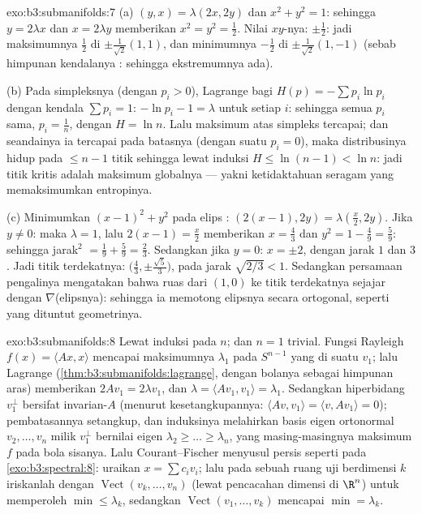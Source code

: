 \begin{solution}{exo:b3:submanifolds:7}
(a) $(y, x) = \lambda(2x, 2y)$ dan $x^2 + y^2 = 1$: sehingga $y =
2\lambda x$ dan $x = 2\lambda y$ memberikan $x^2 = y^2 = \frac12$.
Nilai $xy$-nya: $\pm\frac12$: jadi maksimumnya $\frac12$ di
$\pm\frac1{\sqrt2}(1,1)$, dan minimumnya $-\frac12$ di
$\pm\frac1{\sqrt2}(1,-1)$ (sebab himpunan kendalanya :
sehingga ekstremumnya ada).

(b) Pada  simpleksnya (dengan $p_i > 0$), Lagrange bagi
$H(p) = -\sum p_i\ln p_i$ dengan kendala $\sum p_i = 1$:
$-\ln p_i - 1 = \lambda$ untuk setiap $i$: sehingga semua $p_i$ sama, $p_i =
\frac1n$, dengan $H = \ln n$. Lalu maksimum atas simpleks 
tercapai; dan seandainya ia tercapai pada batasnya
(dengan suatu $p_i = 0$), maka distribusinya hidup pada $\leq n - 1$
titik sehingga lewat induksi $H \leq \ln(n-1) < \ln n$: jadi
titik kritis  adalah maksimum globalnya --- yakni
ketidaktahuan seragam yang memaksimumkan entropinya.

(c) Minimumkan $(x-1)^2 + y^2$ pada elips :
$(2(x{-}1), 2y) = \lambda(\frac x2, 2y)$. Jika $y \neq 0$: maka
$\lambda = 1$, lalu $2(x - 1) = \frac x2$ memberikan $x =
\frac43$ dan $y^2 = 1 - \frac49 = \frac59$: sehingga jarak$^2$ $=
\frac19 + \frac59 = \frac23$. Sedangkan jika $y = 0$: $x = \pm2$,
dengan jarak $1$ dan $3$. Jadi titik terdekatnya: $\bigl(\frac43,
\pm\frac{\sqrt5}3\bigr)$, pada jarak $\sqrt{2/3} < 1$. Sedangkan
persamaan pengalinya mengatakan bahwa ruas dari $(1,0)$ ke
titik terdekatnya sejajar dengan $\nabla$(elipsnya): sehingga ia memotong
elipsnya secara ortogonal, seperti yang dituntut geometrinya.
\end{solution}

\begin{solution}{exo:b3:submanifolds:8}
Lewat induksi pada $n$; dan $n = 1$ trivial. Fungsi Rayleigh
$f(x) = \langle Ax, x\rangle$ mencapai maksimumnya $\lambda_1$
pada $S^{n-1}$ yang  di suatu $v_1$; lalu Lagrange
(\cref{thm:b3:submanifolds:lagrange}, dengan bolanya sebagai himpunan aras)
memberikan $2Av_1 = 2\lambda v_1$, dan $\lambda = \langle Av_1,
v_1\rangle = \lambda_1$. Sedangkan hiperbidang $v_1^\perp$ bersifat
invarian-$A$ (menurut kesetangkupannya: $\langle Av, v_1\rangle = \langle
v, Av_1\rangle = 0$); pembatasannya setangkup, dan
induksinya melahirkan basis eigen ortonormal $v_2, \dots, v_n$
milik $v_1^\perp$ bernilai eigen $\lambda_2 \geq \dots \geq
\lambda_n$, yang masing-masingnya maksimum $f$ pada bola
 sisanya. Lalu Courant--Fischer menyusul persis
seperti pada \cref{exo:b3:spectral:8}: uraikan $x = \sum c_iv_i$;
lalu pada sebuah ruang uji berdimensi $k$ iriskanlah dengan
$\operatorname{Vect}(v_k, \dots, v_n)$ (lewat pencacahan dimensi di
$\R^n$) untuk memperoleh $\min \leq \lambda_k$, sedangkan
$\operatorname{Vect}(v_1, \dots, v_k)$ mencapai $\min =
\lambda_k$.
\end{solution}

